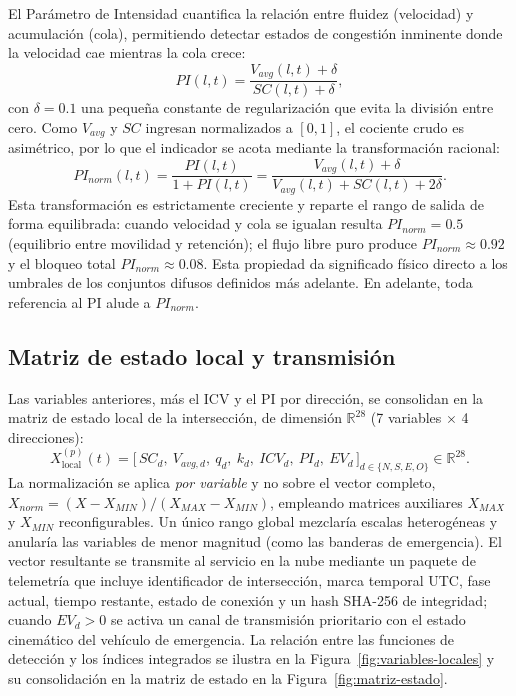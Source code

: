 El Parámetro de Intensidad cuantifica la relación entre fluidez (velocidad) y acumulación
(cola), permitiendo detectar estados de congestión inminente donde la velocidad cae mientras
la cola crece:
\[
PI(l,t) = \frac{V_{avg}(l,t)+\delta}{SC(l,t)+\delta},
\]
con $\delta=0.1$ una pequeña constante de regularización que evita la división entre cero. Como
$V_{avg}$ y $SC$ ingresan normalizados a $[0,1]$, el cociente crudo es asimétrico, por lo que
el indicador se acota mediante la transformación racional:
\[
PI_{norm}(l,t) = \frac{PI(l,t)}{1+PI(l,t)}
= \frac{V_{avg}(l,t)+\delta}{V_{avg}(l,t)+SC(l,t)+2\delta}.
\]
Esta transformación es estrictamente creciente y reparte el rango de salida de forma
equilibrada: cuando velocidad y cola se igualan resulta $PI_{norm}=0.5$ (equilibrio entre
movilidad y retención); el flujo libre puro produce $PI_{norm}\approx 0.92$ y el bloqueo total
$PI_{norm}\approx 0.08$. Esta propiedad da significado físico directo a los umbrales de los
conjuntos difusos definidos más adelante. En adelante, toda referencia al PI alude a
$PI_{norm}$.

\subsection{Matriz de estado local y transmisión}\label{subsec:matriz-estado}

Las variables anteriores, más el ICV y el PI por dirección, se consolidan en la matriz de
estado local de la intersección, de dimensión $\mathbb{R}^{28}$ (7 variables $\times$ 4
direcciones):
\[
X_{\text{local}}^{(p)}(t)=
\big[\,SC_{d},\ V_{avg,d},\ q_{d},\ k_{d},\ ICV_{d},\ PI_{d},\ EV_{d}\,\big]_{d\in\{N,S,E,O\}}
\in \mathbb{R}^{28}.
\]
La normalización se aplica \emph{por variable} y no sobre el vector completo,
$X_{norm}=(X-X_{MIN})/(X_{MAX}-X_{MIN})$, empleando matrices auxiliares $X_{MAX}$ y $X_{MIN}$
reconfigurables. Un único rango global mezclaría escalas heterogéneas y anularía las variables
de menor magnitud (como las banderas de emergencia). El vector resultante se transmite al
servicio en la nube mediante un paquete de telemetría que incluye identificador de
intersección, marca temporal UTC, fase actual, tiempo restante, estado de conexión y un hash
SHA-256 de integridad; cuando $EV_{d}>0$ se activa un canal de transmisión prioritario con el
estado cinemático del vehículo de emergencia. La relación entre las funciones de detección y
los índices integrados se ilustra en la Figura~\ref{fig:variables-locales} y su consolidación
en la matriz de estado en la Figura~\ref{fig:matriz-estado}.

